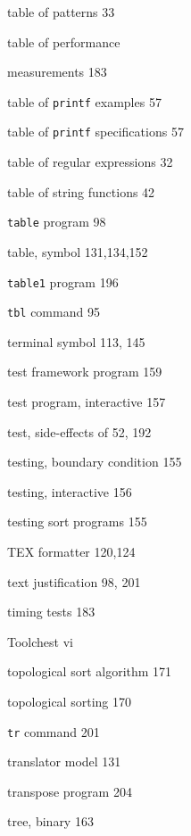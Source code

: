 \begin{multicols}{3}
\hangindent=3pc  table of patterns 33

\hangindent=3pc  table of performance

\hangindent=3pc  measurements 183

\hangindent=3pc  table of \verb'printf' examples 57

\hangindent=3pc  table of \verb'printf' specifications 57

\hangindent=3pc  table of regular expressions 32

\hangindent=3pc  table of string functions 42

\hangindent=3pc  \verb'table' program 98

\hangindent=3pc  table, symbol 131,134,152

\hangindent=3pc  \verb'table1' program 196

\hangindent=3pc  \verb'tbl' command 95

\hangindent=3pc  terminal symbol 113, 145

\hangindent=3pc  test framework program 159

\hangindent=3pc  test program, interactive 157

\hangindent=3pc  test, side-effects of 52, 192

\hangindent=3pc  testing, boundary condition 155

\hangindent=3pc  testing, interactive 156

\hangindent=3pc  testing sort programs 155

\hangindent=3pc  TEX formatter 120,124

\hangindent=3pc  text justification 98, 201

\hangindent=3pc  timing tests 183

\hangindent=3pc  Toolchest vi

\hangindent=3pc  topological sort algorithm 171

\hangindent=3pc  topological sorting 170

\hangindent=3pc  \verb'tr' command 201

\hangindent=3pc  translator model 131

\hangindent=3pc  transpose program 204

\hangindent=3pc  tree, binary 163


\end{multicols}
